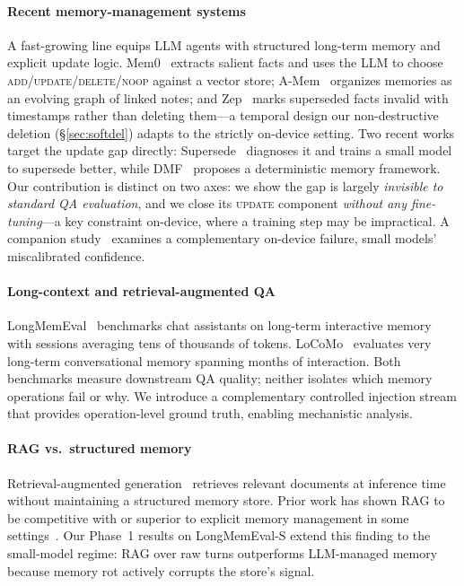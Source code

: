 \documentclass[10pt, twocolumn]{article}
\begin{document}
\paragraph{Recent memory-management systems}
A fast-growing line equips LLM agents with structured long-term memory and
explicit update logic. Mem0~\cite{mem0} extracts salient facts and uses the LLM
to choose \textsc{add}/\textsc{update}/\textsc{delete}/\textsc{noop} against a
vector store; A-Mem~\cite{amem} organizes memories as an evolving graph of linked
notes; and Zep~\cite{zep} marks superseded facts invalid with timestamps rather
than deleting them---a temporal design our non-destructive deletion
(\S\ref{sec:softdel}) adapts to the strictly on-device setting. Two recent works
target the update gap directly: Supersede~\cite{supersede} diagnoses it and
trains a small model to supersede better, while DMF~\cite{dmf} proposes a
deterministic memory framework. Our contribution is distinct on two axes: we show
the gap is largely \emph{invisible to standard QA evaluation}, and we close its
\textsc{update} component \emph{without any fine-tuning}---a key constraint
on-device, where a training step may be impractical. A companion
study~\cite{mudgal2026slm} examines a complementary on-device failure, small
models' miscalibrated confidence.

\paragraph{Long-context and retrieval-augmented QA}
LongMemEval~\cite{wu2024longmemeval} benchmarks chat assistants on long-term
interactive memory with sessions averaging tens of thousands of tokens.
LoCoMo~\cite{maharana2024evaluating} evaluates very long-term conversational
memory spanning months of interaction.
Both benchmarks measure downstream QA quality; neither isolates which
memory operations fail or why.
We introduce a complementary controlled injection stream that provides
operation-level ground truth, enabling mechanistic analysis.

\paragraph{RAG vs.\ structured memory}
Retrieval-augmented generation~\cite{lewis2020retrieval} retrieves relevant
documents at inference time without maintaining a structured memory store.
Prior work has shown RAG to be competitive with or superior to explicit
memory management in some settings~\cite{shi2023large}.
Our Phase~1 results on LongMemEval-S extend this finding to the small-model
regime: RAG over raw turns outperforms LLM-managed memory because memory
rot actively corrupts the store's signal.
\end{document}
